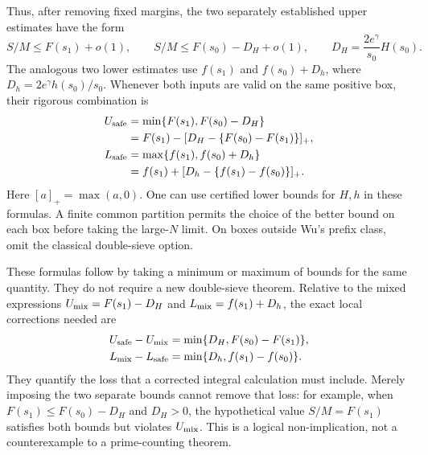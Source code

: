 \documentclass[11pt]{article}
\begin{document}
Thus, after removing fixed margins, the two separately established
upper estimates have the form
\[
 S/M\le F(s_1)+o(1),\qquad
 S/M\le F(s_0)-D_H+o(1),\qquad
 D_H=\frac{2e^\gamma}{s_0}H(s_0).
\]
The analogous two lower estimates use $f(s_1)$ and
$f(s_0)+D_h$, where $D_h=2e^\gamma h(s_0)/s_0$.
Whenever both inputs are valid on the same positive box, their
rigorous combination is
\begin{align}
 U_{\rm safe}
 &=\min\{F(s_1),F(s_0)-D_H\}\notag\\
 &=F(s_1)-[D_H-\{F(s_0)-F(s_1)\}]_+,
 \label{eq:external-safe-upper}\\
 L_{\rm safe}
 &=\max\{f(s_1),f(s_0)+D_h\}\notag\\
 &=f(s_1)+[D_h-\{f(s_1)-f(s_0)\}]_+.
 \label{eq:external-safe-lower}
\end{align}
Here $[a]_+=\max(a,0)$. One can use certified lower bounds for
$H,h$ in these formulas. A finite common partition permits the
choice of the better bound on each box before taking the
large-$N$ limit. On boxes outside Wu's prefix class, omit the
classical double-sieve option.

These formulas follow by taking a minimum or maximum of bounds
for the same quantity. They do not require a new double-sieve
theorem. Relative to the mixed expressions
$U_{\rm mix}=F(s_1)-D_H$ and $L_{\rm mix}=f(s_1)+D_h$, the exact
local corrections needed are
\begin{align*}
 U_{\rm safe}-U_{\rm mix}
   &=\min\{D_H,F(s_0)-F(s_1)\},\\
 L_{\rm mix}-L_{\rm safe}
   &=\min\{D_h,f(s_1)-f(s_0)\}.
\end{align*}
They quantify the loss that a corrected integral calculation
must include. Merely imposing the two separate bounds cannot
remove that loss: for example, when
$F(s_1)\le F(s_0)-D_H$ and $D_H>0$, the hypothetical value
$S/M=F(s_1)$ satisfies both bounds but violates $U_{\rm mix}$.
This is a logical non-implication, not a counterexample to a
prime-counting theorem.
\end{document}
